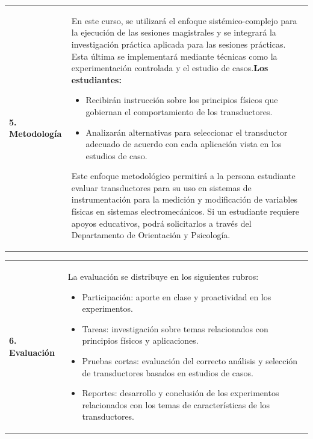 \documentclass[letterpaper]{article}%
\begin{document}
\begin{tabularx}{\textwidth}{p{3cm}p{13cm}}%
\par\fontsize{12}{14}\selectfont \textbf{\textcolor{parte}{5. Metodología}}&En este curso, se utilizará el enfoque sistémico-complejo para la ejecución de las sesiones magistrales y se integrará la investigación práctica aplicada para las sesiones prácticas. Esta última se implementará mediante técnicas como la experimentación controlada y el estudio de casos.\newline\newline \textbf{Los estudiantes:}\begin{itemize}\item Recibirán instrucción sobre los principios físicos que gobiernan el comportamiento de los transductores.\item Analizarán alternativas para seleccionar el transductor adecuado de acuerdo con cada aplicación vista en los estudios de caso.\end{itemize}\vspace*{2mm}Este enfoque metodológico permitirá a la persona estudiante evaluar transductores para su uso en sistemas de instrumentación para la medición y modificación de variables físicas en sistemas electromecánicos.\vspace*{2mm} \newline  Si un estudiante requiere apoyos educativos, podrá solicitarlos a través del Departamento de Orientación y Psicología.\\%
\end{tabularx}%
\vspace*{4mm}%
\newline%
\begin{tabularx}{\textwidth}{p{3cm}p{13cm}}%
\par\fontsize{12}{14}\selectfont \textbf{\textcolor{parte}{6. Evaluación}}&La evaluación se distribuye en los siguientes rubros:\vspace*{1mm} \newline  \begin{itemize} \item Participación: aporte en clase y proactividad en los experimentos. \item Tareas: investigación sobre temas relacionados con principios físicos y aplicaciones. \item Pruebas cortas: evaluación del correcto análisis y selección de transductores basados en estudios de casos. \item Reportes: desarrollo y conclusión de los experimentos relacionados con los temas de características de los transductores. \end{itemize}\\%
\end{tabularx}%
\end{document}
